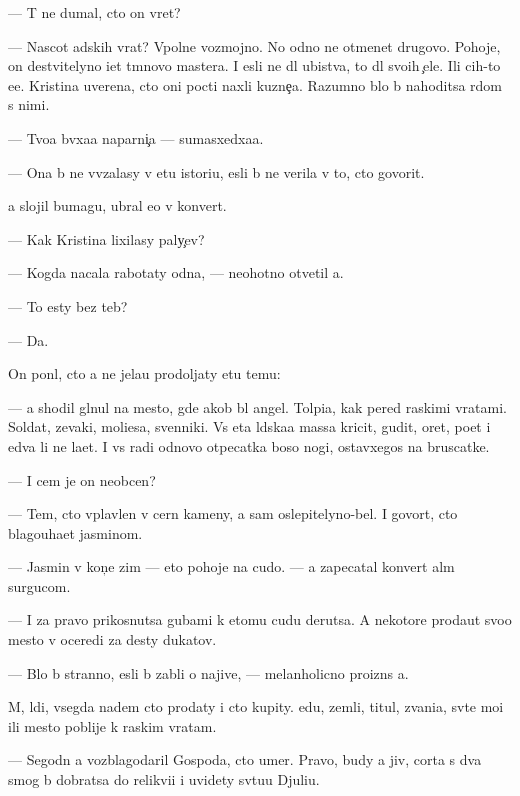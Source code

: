 \documentclass[10pt]{book}
\begin{document}
— T{\yi} ne dumal, cto on vret?

— Nascot adskih vrat? Vpolne vozmojno. No odno ne otmen{\ia}{\y}et drugovo. Pohoje, on de{\y}stvitelyno i{\x}et t{\e}mnovo mastera. I {\y}esli ne dl{\ia} ubi{\y}stva, to dl{\ia} svo{\y}ih {\c}ele{\y}. Ili c{\yf}ih-to {\y}e{\x}e. Kristina uverena, cto oni pocti naxli kuzne{\c}a. Razumno b{\yi}lo b{\yi} nahoditsa r{\ia}dom s nimi.

— Tvo{\y}a b{\yi}vxa{\y}a naparni{\c}a — sumasxedxa{\y}a.

— Ona b{\yi} ne vv{\ia}zalasy v etu istori{\y}u, {\y}esli b{\yi} ne verila v to, cto govorit.

{\Y}a slojil bumagu, ubral {\y}e{\y}o v konvert.

— Kak Kristina lixilasy paly{\c}ev?

— Kogda nacala rabotaty odna, — neohotno otvetil {\y}a.

— To {\y}esty bez teb{\ia}?

— Da.

On pon{\ia}l, cto {\y}a ne jela{\y}u prodoljaty etu temu:

— {\Y}a shodil gl{\ia}nul na mesto, gde {\y}akob{\yi} b{\yi}l angel. Tolpi{\x}a, kak pered ra{\y}skimi vratami. Soldat{\yi}, zevaki, mol{\ia}{\x}i{\y}esa, sv{\ia}{\x}enniki. Vs{\ia} eta l{\iu}dska{\y}a massa kricit, gudit, oret, po{\y}et i {\y}edva li ne la{\y}et. I vs{\e} radi odnovo otpecatka boso{\y} nogi, ostavxegos{\ia} na bruscatke.

— I cem je on neob{\yi}cen?

— Tem, cto vplavlen v cern{\yi}{\y} kameny, a sam oslepitelyno-bel. I govor{\ia}t, cto blagouha{\y}et jasminom.

— Jasmin v kon{\c}e zim{\yi} — eto pohoje na cudo. — {\Y}a zapecatal konvert al{\yi}m surgucom.

— I za pravo prikosnutsa gubami k etomu cudu derutsa. A nekotor{\yi}{\y}e proda{\y}ut svo{\y}o mesto v oceredi za des{\ia}ty dukatov.

— B{\yi}lo b{\yi} stranno, {\y}esli b{\yi} zab{\yi}li o najive, — melanholicno proizn{\e}s {\y}a.

M{\yi}, l{\iu}di, vsegda na{\y}dem cto prodaty i cto kupity. {\Y}edu, zemli, titul{\yi}, zvani{\y}a, sv{\ia}t{\yi}{\y}e mo{\x}i ili mesto poblije k ra{\y}skim vratam.

— Segodn{\ia} {\y}a vozblagodaril Gospoda, cto umer. Pravo, budy {\y}a jiv, corta s dva smog b{\yi} dobratsa do relikvi{\y}i i uvidety sv{\ia}tu{\y}u Djuli{\y}u.
\end{document}
